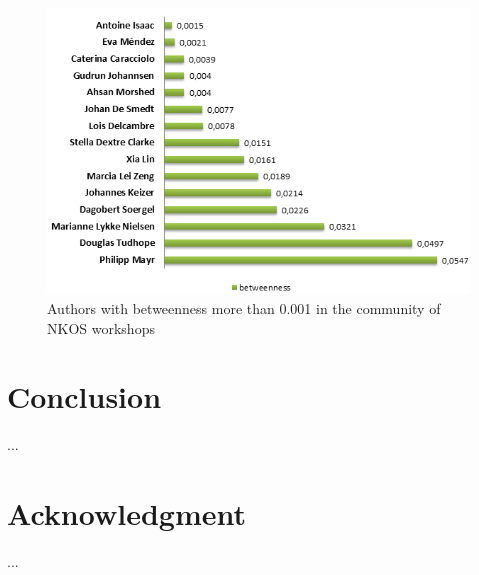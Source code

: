 \documentclass[runningheads,a4paper]{llncs}
\begin{document}
\begin{figure}
\centering
\includegraphics[width=0.7\linewidth]{betweenness}
\caption{Authors with betweenness more than 0.001 in the community of NKOS workshops}
\label{fig:betweenness}
\end{figure}






\section{Conclusion}\label{concl}
...%

\section{Acknowledgment}\label{sec:ACKNOWLEDGMENTS}
...

\newpage

 
\end{document}
